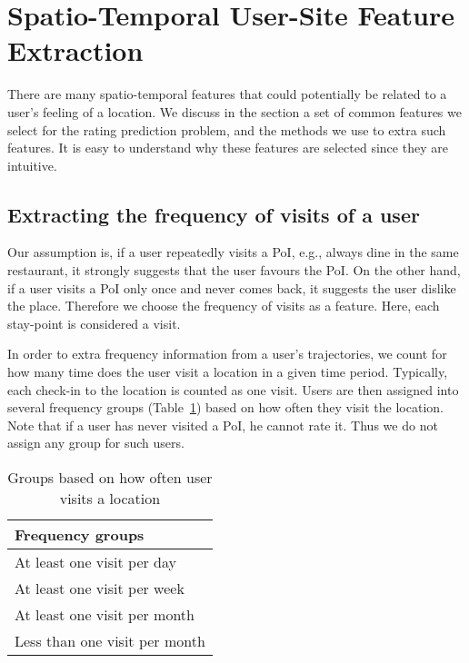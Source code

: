 \section{Spatio-Temporal User-Site Feature Extraction}
\label{sec:method}

There are many spatio-temporal features that could potentially be related to a user's feeling of a location. We discuss in the section a set of common features we select for the rating prediction problem, and the methods we use to extra such features. It is easy to understand why these features are selected since they are intuitive.

\subsection{Extracting the frequency of visits of a user}

Our assumption is, if a user repeatedly visits a PoI, e.g., always dine in the same restaurant, it strongly suggests that the user favours the PoI. On the other hand, if a user visits a PoI only once and never comes back, it suggests the user dislike the place. Therefore we choose the frequency of visits as a feature. Here, each stay-point is considered a visit.

In order to extra frequency information from a user's trajectories, we count for how many time does the user visit a location in a given time period. Typically, each check-in to the location is counted as one visit. Users are then assigned into several frequency groups (Table~\ref{frequencyGroups}) based on how often they visit the location. Note that if a user has never visited a PoI, he cannot rate it. Thus we do not assign any group for such users.

\begin{table}[htbp]
\begin{center}
\caption{Groups based on how often user visits a location \label{frequencyGroups}}
\begin{tabular}{|l|} \hline
\textbf{Frequency groups} \\ \hline
At least one visit per day \\ \hline
At least one visit per week \\ \hline
At least one visit per month \\ \hline
Less than one visit per month \\ \hline
\end{tabular}
\end{center}
\end{table}

